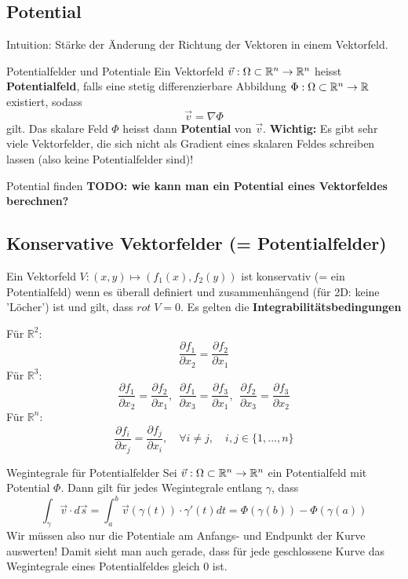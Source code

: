 \subsection{Potential}

Intuition: Stärke der Änderung der Richtung der Vektoren in einem Vektorfeld.

\begin{Definition}{Potentialfelder und Potentiale}{}
	Ein Vektorfeld $\vec{v} : \Omega \subset \mathbb{R}^n \to \mathbb{R}^n$ heisst \textbf{Potentialfeld}, falls eine stetig differenzierbare Abbildung $\Phi : \Omega \subset \mathbb{R}^n \to \mathbb{R}$ existiert, sodass \[\vec{v} = \nabla \Phi\] gilt. Das skalare Feld $\Phi$ heisst dann \textbf{Potential} von $\vec{v}$. \textbf{Wichtig:} Es gibt sehr viele Vektorfelder, die sich nicht als Gradient eines skalaren Feldes schreiben lassen (also keine Potentialfelder sind)!
\end{Definition}

\begin{Rezept}{Potential finden}{}
	\textbf{TODO: wie kann man ein Potential eines Vektorfeldes berechnen?}
\end{Rezept}

\subsection{Konservative Vektorfelder (= Potentialfelder)}
Ein Vektorfeld $V: (x, y) \mapsto (f_1(x), f_2(y))$ ist konservativ (= ein Potentialfeld) wenn es überall definiert
und zusammenhängend (für 2D: keine 'Löcher') ist und gilt, dass $rot \;V = 0$. Es gelten die \textbf{Integrabilitätsbedingungen} \\ 
\begin{multicols}{2}
Für $\mathbb{R}^2$:
\[ \frac{\partial f_1}{\partial x_2} = \frac{\partial f_2}{\partial x_1} \]
Für $\mathbb{R}^3$:
\[ \frac{\partial f_1}{\partial x_2} =  \frac{\partial f_2}{\partial x_1}, 
~~  \frac{\partial f_1}{\partial x_3} = \frac{\partial f_3}{\partial x_1},
~~ \frac{\partial f_2}{\partial x_3} =  \frac{\partial f_3}{\partial x_2}
\]
Für $\mathbb{R}^n$:
\[
	\frac{\partial f_i}{\partial x_j} =  \frac{\partial f_j}{\partial x_i},
	\quad
	\forall i \neq j,
	\quad
	i, j \in \{1,...,n\}
\]
\end{multicols}

\begin{Satz}{Wegintegrale für Potentialfelder}{}
	Sei $\vec{v} : \Omega \subset \mathbb{R}^n \to \mathbb{R}^n$ ein Potentialfeld mit Potential $\Phi$. Dann gilt für jedes Wegintegrale entlang $\gamma$, dass
	\[
		\int_\gamma \vec{v} \cdot d\vec{s} = 
		\int_a^b \vec{v}(\gamma(t)) \cdot \gamma'(t) dt =
		\Phi(\gamma(b)) - \Phi(\gamma(a))
	\]
	Wir müssen also nur die Potentiale am Anfangs- und Endpunkt der Kurve auswerten! Damit sieht man auch gerade, dass für jede geschlossene Kurve das Wegintegrale eines Potentialfeldes gleich 0 ist. 
\end{Satz}

